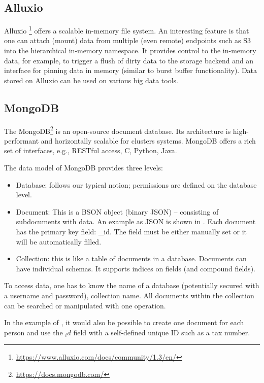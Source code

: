 \documentclass{../../template/esiwace-report}
\begin{document}
\subsection{Alluxio}
Alluxio \footnote{\url{https://www.alluxio.com/docs/community/1.3/en/}} offers a scalable in-memory file system.
An interesting feature is that one can attach (mount) data from multiple (even remote) endpoints such as S3 into the hierarchical in-memory namespace.
It provides control to the in-memory data, for example, to trigger a flush of dirty data to the storage backend and an interface for pinning data in memory (similar to burst buffer functionality).
Data stored on Alluxio can be used on various big data tools. 

\subsection{MongoDB}
The MongoDB\footnote{\url{https://docs.mongodb.com/}} is an open-source document database.
Its architecture is high-performant and horizontally scalable for clusters systems.
MongoDB offers a rich set of interfaces, e.g., RESTful access, C, Python, Java.

The data model of MongoDB provides three levels:
\begin{itemize}
  \item Database: follows our typical notion; permissions are defined on the database level.
  \item Document: This is a BSON object (binary JSON) -- consisting of subdocuments with data.
  An example as JSON is shown in .
  Each document has the primary key field: \_id. The field must be either manually set or it will be automatically filled.
  
  \item Collection: this is like a table of documents in a database. Documents can have individual schemas. It supports indices on fields (and compound fields).
\end{itemize}
To access data, one has to know the name of a database (potentially secured with a username and password), collection name. All documents within the collection can be searched or manipulated with one operation. 

In the example of , it would also be possible to create one document for each person and use the $_id$ field with a self-defined unique ID such as a tax number.
\end{document}
